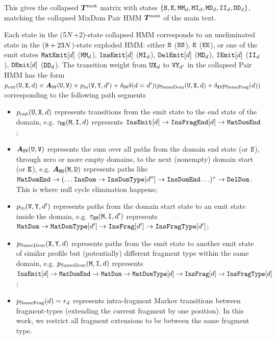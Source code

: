 \documentclass{article}
\newcommand{\ext}{r}
\begin{document}
This gives the collapsed $\bm{T}^{\rm nest}$ matrix with states
$\{{\tt S}, {\tt E}, \mathtt{MM}_d, \mathtt{MI}_d, \mathtt{MD}_d, \mathtt{II}_d, \mathtt{DD}_d\}$,
matching the collapsed MixDom Pair HMM $\bm{T}^{\rm nest}$ of the main text.

Each state in the ($5N$+2)-state collapsed HMM corresponds to an uneliminated state in the ($8+23N$)-state exploded HMM: either ${\tt S}$ (${\tt S}{\tt S}$), ${\tt E}$ (${\tt E}{\tt E}$), or one of the emit states
$\mathtt{MatEmit}[d]$ ($\mathtt{MM}_{d}$), $\mathtt{InsEmit}[d]$ (${\tt M}{\tt I}_{d}$), $\mathtt{DelEmit}[d]$ (${\tt M}{\tt D}_{d}$),
  $\mathtt{IEmit}[d]$ (${\tt I}{\tt I}_{d}$), $\mathtt{DEmit}[d]$ (${\tt D}{\tt D}_{d}$).
The transition weight from ${\tt U}{\tt X}_{d}$ to ${\tt V}{\tt Y}_{d^\prime}$ in the collapsed Pair HMM
has the form $p_\mathrm{out}({\tt U},{\tt X},d) \times \bm{A}_{{\tt U}{\tt V}}({\tt U},{\tt V}) \times p_\mathrm{in}({\tt V},{\tt Y},d^\prime) + \delta_{{\tt U}{\tt V}} \delta(d=d^\prime) (p_\text{SameDom}({\tt U},{\tt X},d) + \delta_{{\tt X}{\tt Y}} p_\text{SameFrag}(d))$
corresponding to the following path segments
\begin{itemize}
  \item $p_\mathrm{out}({\tt U},{\tt X},d)$ represents transitions from the emit state to the end state of the domain, e.g. $\tau_{{\tt M}{\tt E}}({\tt M},{\tt I},d)$ represents $\mathtt{InsEmit}[d] \to \mathtt{InsFragEnd}[d] \to \mathtt{MatDomEnd}$;
  \item $\bm{A}_{{\tt U}{\tt V}}({\tt U},{\tt V})$ represents the sum over all paths from the domain end state (or ${\tt S}$), through zero or more empty domains, to the next (nonempty) domain start (or ${\tt E}$), e.g. $\bm{A}_{{\tt M}{\tt D}}({\tt M},{\tt D})$ represents paths like $\mathtt{MatDomEnd} \to (\ldots \mathtt{InsDom} \to \mathtt{InsDomType}[d''] \to \mathtt{InsDomEnd} \ldots )^\ast \to \mathtt{DelDom}$. This is where null cycle elimination happens;
  \item $p_\mathrm{in}({\tt V},{\tt Y},d^\prime)$ represents paths from the domain start state to an emit state inside the domain, e.g. $\tau_{{\tt S}{\tt M}}({\tt M},{\tt I},d^\prime)$ represents $\mathtt{MatDom} \to \mathtt{MatDomType}[d^\prime] \to \mathtt{InsFrag}[d^\prime] \to \mathtt{InsFragType}[d^\prime]$;
  \item $p_\text{SameDom}({\tt X},{\tt Y},d)$ represents paths from the emit state to another emit state of similar profile but (potentially) different fragment type within the same domain, e.g. $p_\text{SameDom}({\tt M},{\tt I},d)$ represents $\mathtt{InsEmit}[d] \to \mathtt{MatDomEnd} \to \mathtt{MatDom} \to \mathtt{MatDomType}[d] \to \mathtt{InsFrag}[d] \to \mathtt{InsFragType}[d]$;
  \item $p_\text{SameFrag}(\srcdom) = \ext_{\srcdom}$ represents intra-fragment Markov transitions between fragment-types (extending the current fragment by one position). In this work, we restrict all fragment extensions to be between the same fragment type.
\end{itemize}
\end{document}
